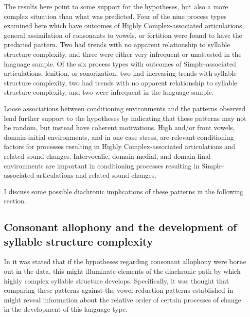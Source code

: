   The results here point to some support for the hypotheses, but also a more complex situation than what was predicted. Four of the nine process types examined here which have outcomes of Highly Complex-associated articulations, general assimilation of consonants to vowels, or fortition were found to have the predicted pattern. Two had trends with no apparent relationship to syllable structure complexity, and three were either very infrequent or unattested in the language sample. Of the six process types with outcomes of Simple-associated articulations, lenition, or sonorization, two had increasing trends with syllable structure complexity, two had trends with no apparent relationship to syllable structure complexity, and two were infrequent in the language sample.

  Loose associations between conditioning environments and the patterns observed lend further support to the hypotheses by indicating that these patterns may not be random, but instead have coherent motivations. High and/or front vowels, domain-initial environments, and in one case stress, are relevant conditioning factors for processes resulting in Highly Complex-associated articulations and related sound changes. Intervocalic, domain-medial, and domain-final environments are important in conditioning processes resulting in Simple-as\-so\-ci\-at\-ed articulations and related sound changes. 

  I discuss some possible diachronic implications of these patterns in the following section.

\subsection{Consonant allophony and the development of syllable structure complexity} \label{sec:7.4.1}

  In  it was stated that if the hypotheses regarding consonant allophony were borne out in the data, this might illuminate elements of the diachronic path by which highly complex syllable structure develops. Specifically, it was thought that comparing these patterns against the vowel reduction patterns established in  might reveal information about the relative order of certain processes of change in the development of this language type.

